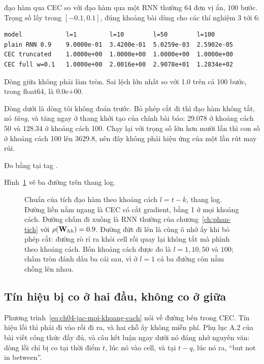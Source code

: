 \begin{measured}{đạo hàm qua CEC so với đạo hàm qua một RNN thường}
64 đơn vị ẩn, 100 bước. Trọng số  lấy trong
\([-0.1, 0.1]\), đúng khoảng bài dùng cho các thí nghiệm 3 tới 6:

\begin{verbatim}
model            l=1         l=10        l=50        l=100
plain RNN 0.9    9.0000e-01  3.4200e-01  5.0259e-03  2.5902e-05
CEC truncated    1.0000e+00  1.0000e+00  1.0000e+00  1.0000e+00
CEC full w=0.1   1.0000e+00  2.0016e+00  2.9078e+01  1.2834e+02
\end{verbatim}

Dòng giữa không phải làm tròn. Sai lệch lớn nhất so với 1.0 trên cả 100 bước,
trong float64, là 0.0e+00.

Dòng dưới là dòng tôi không đoán trước. Bỏ phép cắt đi thì đạo hàm không tắt,
nó \emph{tăng}, và tăng ngay ở thang khởi tạo của chính bài báo: 29.078 ở
khoảng cách 50 và 128.34 ở khoảng cách 100. Chạy lại với trọng số lớn hơn mười
lần thì con số ở khoảng cách 100 lên 3629.8, nên đây không phải hiệu ứng của
một lần rút may rủi.

Đo bằng  tại tag .
\end{measured}

Hình~\ref{fig:ch04-dong-loi} vẽ ba đường trên thang log.

\begin{figure}[htbp]
  \centering
  
  \caption{Chuẩn của tích đạo hàm theo khoảng cách \(l = t - k\), thang log.
    Đường liền nằm ngang là CEC có cắt gradient, bằng 1 ở mọi khoảng cách.
    Đường chấm đi xuống là RNN thường của chương~\ref{ch:phan-tich} với
    \(\rho(\mathbf{W}_{hh}) = 0.9\). Đường đứt đi lên là cùng ô nhớ ấy khi bỏ phép
    cắt: đường rò rỉ ra khỏi cell rồi quay lại không tắt mà phình theo khoảng
    cách. Bốn khoảng cách được đo là \(l = 1, 10, 50\) và \(100\); chấm tròn
    đánh dấu ba cái sau, vì ở \(l = 1\) cả ba đường còn nằm chồng lên nhau.}
  \label{fig:ch04-dong-loi}
\end{figure}

\subsection*{Tín hiệu bị co ở hai đầu, không co ở giữa}

%
Phương trình~\eqref{eq:ch04-jac-moi-khoang-cach} nói về đường bên trong CEC.
Tín hiệu lỗi thì phải đi vào rồi đi ra, và hai chỗ ấy không miễn phí. Phụ lục
A.2 của bài viết công thức đầy đủ, và câu kết luận ngay dưới nó đáng nhớ
nguyên văn: dòng lỗi chỉ bị co tại thời điểm \(t\), lúc nó vào cell, và tại
\(t - q\), lúc nó ra, \enquote{but not in between}.


